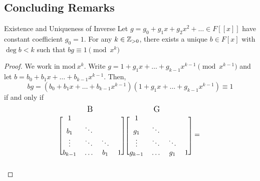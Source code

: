 \subsection{Concluding Remarks}
\begin{theorem}{Existence and Uniqueness of Inverse}{}
    Let $g = g_0 + g_1x + g_2x^2 + \ldots \in F[[x]]$ have constant coefficient $g_0 = 1$.
    For any $k \in \operatorname{\mathbb{Z}}_{> 0}$, there exists a unique $b \in F[x]$ with $\deg b < k$ such that $bg \equiv 1 \pmod{x^k}$
\end{theorem}
\begin{proof}
    We work in $\mathrm{mod}\ x^k$.
    Write $g = 1 + g_1x + \ldots + g_{k-1}x^{k-1} \pmod{x^{k-1}}$ and let $b = b_0 + b_1x + \ldots + b_{k-1}x^{k-1}$.
    Then,
    \begin{equation*}
        bg = (b_0 + b_1x + \ldots + b_{k-1}x^{k-1})(1 + g_1x + \ldots + g_{k-1}x^{k-1}) \equiv 1
    \end{equation*}
    if and only if
    \begin{equation*}
        \begin{blockarray}{crcc}
            & \text{\large B} & &  \\
           \begin{block}{[cccc]}
                1       &           &          &   \\
                b_1     & \ddots    &          &   \\
                \vdots  & \ddots    & \ddots   &   \\
                b_{k-1} & \ldots    & b_1      & 1 \\
            \end{block}
       \end{blockarray}
       \begin{blockarray}{crcc}
            & \text{\large G} & &  \\
            \begin{block}{[cccc]}
                1       &           &          &   \\
                g_1     & \ddots    &          &   \\
                \vdots  & \ddots    & \ddots   &   \\
                g_{k-1} & \ldots    & g_1      & 1 \\
            \end{block}
        \end{blockarray}
        =
        \begin{blockarray}{cclc}

\end{blockarray}
\end{equation*}
\end{proof}
